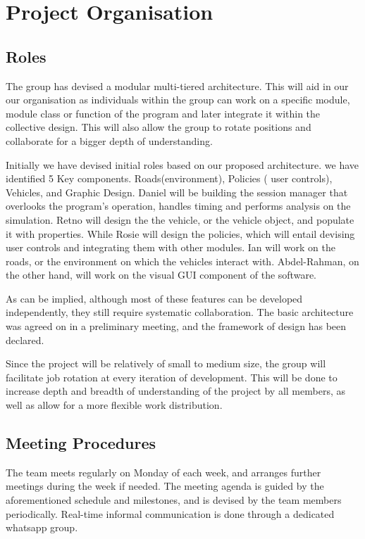 \documentclass[11pt]{article}
\begin{document}
\section{Project Organisation}
\subsection{Roles}
The group has devised a modular multi-tiered architecture. This will aid in our our organisation as individuals within the group can work on a specific module, module class or function of the program and later integrate it within the collective design. This will also allow the group to rotate positions and collaborate for a bigger depth of understanding.

Initially we have devised initial roles based on our proposed architecture.  we have identified 5 Key components. Roads(environment), Policies ( user controls), Vehicles, and Graphic Design. Daniel will be building the session manager that overlooks the program’s operation, handles timing and performs analysis on the simulation. Retno will design the the vehicle, or the vehicle object, and populate it with properties. While Rosie will design the policies, which will entail devising user controls and integrating them with other modules. Ian will work on the roads, or the environment on which the vehicles interact with. Abdel-Rahman, on the other hand, will work on the visual GUI component of the software.

As can be implied, although most of these features can be developed independently, they still require systematic collaboration. The basic architecture was agreed on in a preliminary meeting, and the framework of design has been declared.

Since the project will be relatively of small to medium size, the group will facilitate job rotation at every iteration of development. This will be done to increase depth and breadth of understanding of the project by all members, as well as allow for a more flexible work distribution. 

\subsection{Meeting Procedures}


The team meets regularly on Monday of each week, and arranges further meetings during the week if needed. The meeting agenda is guided by the aforementioned schedule and milestones, and is devised by the team members periodically. Real-time informal communication is done through a dedicated whatsapp group.
\end{document}
